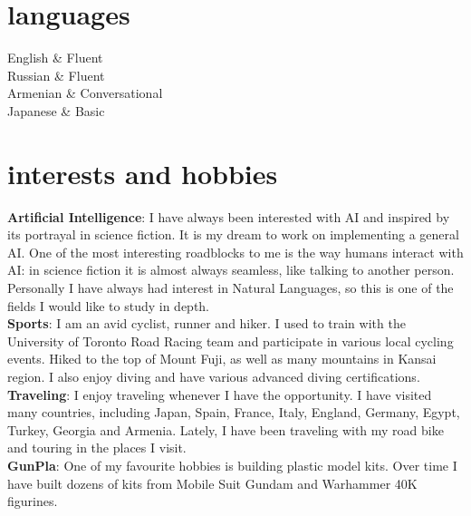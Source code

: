 \documentclass[]{cv-roald}
\begin{document}
\section*{languages}
\begin{tabularcv}
    English			&	Fluent \\[\vspacepar]
    Russian			&	Fluent \\[\vspacepar]
    Armenian		&	Conversational \\[\vspacepar]
    Japanese        &   Basic
\end{tabularcv}

\section*{interests and hobbies}
\textbf{Artificial Intelligence}: I have always been interested with AI and inspired by its portrayal in science fiction. It is my dream to work on implementing a general AI. One of the most interesting roadblocks to me is the way humans interact with AI: in science fiction it is almost always seamless, like talking to another person. Personally I have always had interest in Natural Languages, so this is one of the fields I would like to study in depth.\\
\textbf{Sports}: I am an avid cyclist, runner and hiker. I used to train with the University of Toronto Road Racing team and participate in various local cycling events. Hiked to the top of Mount Fuji, as well as many mountains in Kansai region. I also enjoy diving and have various advanced diving certifications. \\
\textbf{Traveling}: I enjoy traveling whenever I have the opportunity. I have visited many countries, including Japan, Spain, France, Italy, England, Germany, Egypt, Turkey, Georgia and Armenia. Lately, I have been traveling with my road bike and touring in the places I visit.\\
\textbf{GunPla}: One of my favourite hobbies is building plastic model kits. Over time I have built dozens of kits from Mobile Suit Gundam and Warhammer 40K figurines.\\
\end{document}
